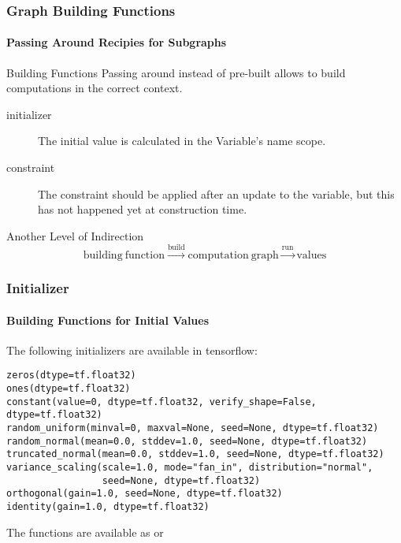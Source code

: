 \begin{frame}
    \frametitle{Graph Building Functions}
    \framesubtitle{Passing Around Recipies for Subgraphs}
    \begin{block}{Building Functions}
    Passing around  instead of pre-built 
    allows to build computations in the correct context.
    \begin{description}
        \item[initializer] The initial value is calculated in the Variable's name scope.
        \item[constraint] The constraint should be applied after an update to the variable, but 
        this has not happened yet at construction time.
    \end{description}        
    \end{block}

    \begin{block}{Another Level of Indirection}
        \[\mathrm{building ~ function} \stackrel{\mathrm{build}}{\longrightarrow} \mathrm{computation ~ graph} \stackrel{\mathrm{run}}{\longrightarrow} \mathrm{values}
     \]
    \end{block}
\end{frame}

\begin{frame}[fragile]
    \frametitle{Initializer}
    \framesubtitle{Building Functions for Initial Values}
    The following initializers are available in tensorflow:
\begin{lstlisting}
zeros(dtype=tf.float32)
ones(dtype=tf.float32)
constant(value=0, dtype=tf.float32, verify_shape=False, dtype=tf.float32)
random_uniform(minval=0, maxval=None, seed=None, dtype=tf.float32)
random_normal(mean=0.0, stddev=1.0, seed=None, dtype=tf.float32)
truncated_normal(mean=0.0, stddev=1.0, seed=None, dtype=tf.float32)
variance_scaling(scale=1.0, mode="fan_in", distribution="normal", 
                 seed=None, dtype=tf.float32)
orthogonal(gain=1.0, seed=None, dtype=tf.float32)
identity(gain=1.0, dtype=tf.float32)
\end{lstlisting}
The functions are available as  or 
\end{frame}

